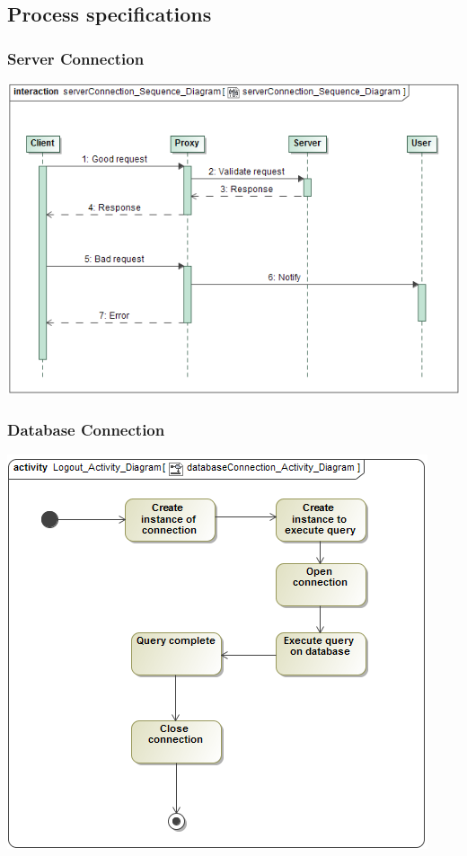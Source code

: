 \documentclass[11pt]{article}
\begin{document}
	\newpage
	
	\subsection{Process specifications}
	
	\subsubsection{Server Connection}
	\begin{center}
		\includegraphics[width=\textwidth]{../Images/Server_Connection_Sequence_Diagram.png}\\[0.5cm]
	\end{center}
	
	\newpage
	\subsubsection{Database Connection}
	\begin{center}
		\includegraphics[width=\textwidth]{../Images/Database_Connection_Activity_Diagram.png}\\[0.5cm]
	\end{center}
	
\end{document}
